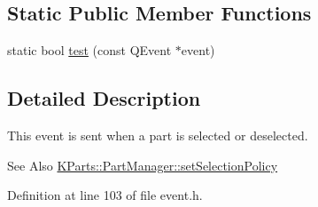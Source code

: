 \subsection*{Static Public Member Functions}
\begin{DoxyCompactItemize}
\item 
static bool \hyperlink{classKParts_1_1PartSelectEvent_acc477c171d8bedc9e9cbcc23cf775024}{test} (const Q\+Event $\ast$event)
\end{DoxyCompactItemize}


\subsection{Detailed Description}
This event is sent when a part is selected or deselected. \begin{DoxySeeAlso}{See Also}
\hyperlink{classKParts_1_1PartManager_a1b9382654eab488363d5f96364dee7ec}{K\+Parts\+::\+Part\+Manager\+::set\+Selection\+Policy} 
\end{DoxySeeAlso}


Definition at line 103 of file event.\+h.




